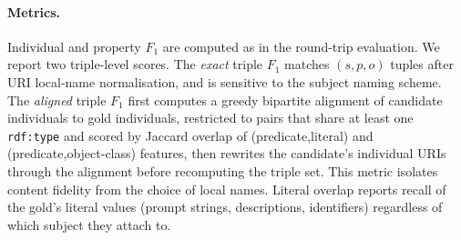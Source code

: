 \paragraph{Metrics.} Individual and property $F_1$ are computed as in
the round-trip evaluation. We report two triple-level scores. The
\emph{exact} triple $F_1$ matches $(s,p,o)$ tuples after URI
local-name normalisation, and is sensitive to the subject naming
scheme. The \emph{aligned} triple $F_1$ first computes a greedy
bipartite alignment of candidate individuals to gold individuals,
restricted to pairs that share at least one \texttt{rdf:type} and
scored by Jaccard overlap of (predicate,literal) and
(predicate,object-class) features, then rewrites the candidate's
individual URIs through the alignment before recomputing the triple
set. This metric isolates content fidelity from the choice of local
names. Literal overlap reports recall of the gold's literal values
(prompt strings, descriptions, identifiers) regardless of which
subject they attach to.

